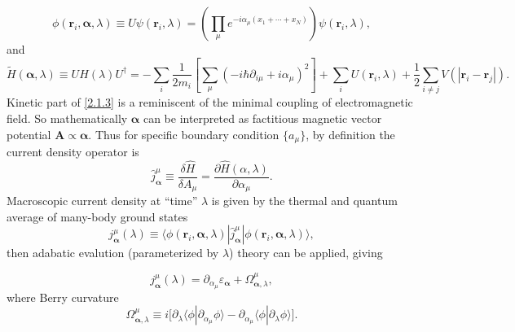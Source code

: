 \documentclass[10pt,nofootinbib]{revtex4}
\begin{document}
		\begin{equation*}
			\phi(\bm{r}_i,\bm{\alpha},\lambda)\equiv U\psi(\bm{r}_i,\lambda)=\left(\prod_\mu e^{-i \alpha_\mu(x_1+\cdots+x_N)}\right)\psi(\bm{r}_i,\lambda),
		\end{equation*}
		and
		\begin{equation}\label{2.1.3}
			\widetilde{H} (\bm{\alpha},\lambda)\equiv U H(\lambda)U^\dagger =-\sum_i\dfrac{1}{2m_i}\left[\sum_\mu\left(-i\hbar \partial_{i\mu}+i \alpha_\mu\right)^2\right]+\sum_i U(\bm{r}_i,\lambda)+\dfrac{1}{2}\sum_{i\neq j}V(|\bm{r}_i-\bm{r}_j|).
		\end{equation}
		Kinetic part of \eqref{2.1.3} is a reminiscent of the minimal coupling of electromagnetic field. So mathematically $\bm{\alpha}$ can be interpreted as factitious magnetic vector potential $\bm{A}\propto\bm{\alpha}$. Thus for specific boundary condition $\{a_\mu\}$, by definition the current density operator is
		\begin{equation}\label{2.1.4}
			\hat{j}^\mu_{\bm{\alpha}}\equiv\dfrac{\delta \hat{H}}{\delta A_\mu}=\dfrac{\partial \hat{H}(\alpha,\lambda)}{\partial \alpha_\mu}.
		\end{equation}
		Macroscopic current density at ``time'' $\lambda$ is given by the thermal and quantum average of many-body ground states
		\begin{equation*}
			j^\mu_{\bm{\alpha}}(\lambda)\equiv\langle\phi(\bm{r}_i,\bm{\alpha},\lambda)|\hat{j}^\mu_{\bm \alpha}|\phi(\bm{r}_i,\bm{\alpha},\lambda)\rangle,
		\end{equation*}
		then adabatic evalution (parameterized by $\lambda$) theory can be applied, giving \cite{bernevig2013topological,xiao2010berry}

		\begin{equation}\label{2.1.5}
			j^\mu_{\bm{\alpha}}(\lambda)=\partial_{\alpha_\mu} \varepsilon_{\bm{\alpha}}+\Omega^\mu_{\bm{\alpha},\lambda},
		\end{equation}
		where Berry curvature
		\begin{equation}\label{2.1.6}
			\Omega^\mu_{\bm{\alpha},\lambda}\equiv i\bigg[\partial_\lambda\langle\phi|\partial_{\alpha_\mu}\phi\rangle- \partial_{\alpha_\mu}\langle\phi|\partial_\lambda\phi\rangle\bigg].
		\end{equation}
\end{document}
